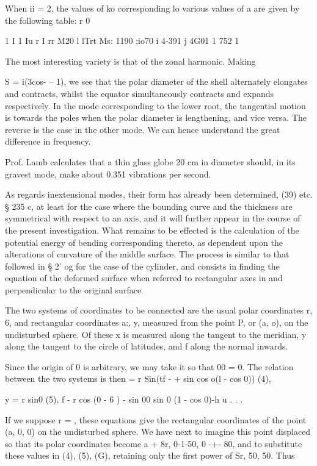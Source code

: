  When ii = 2, the values of ko corresponding lo various values of a are given
by the following table: r 0

1 I 1  Iu r  I rr M20  l lTrt Ms: 1190 ;io70 i 4-391 j 4G01 1 752 1

The most interesting variety is that of the zonal harmonic.  Making

S = i(3cos- -- 1),
we see that the polar diameter of the shell alternately elongates and
contracts, whilst the equator simultaneously contracts and expands
respectively. In the mode corresponding to the lower root, the tangential
motion is towards the poles when the polar diameter is lengthening, and vice
versa.  The reverse is the case in the other mode. We can hence understand the
great difference in frequency.

Prof. Lamb calculates that a thin glass globe 20 cm in diameter should, in its
gravest mode, make about 0.351 vibrations per second.

As regards inextensional modes, their form has already been determined,
(39) etc. § 235 c, at least for the case where the bounding curve and the thickness
are symmetrical with respect to an axis, and it will further appear in the
course of the present investigation. What remains to be effected is the
calculation of the potential energy of bending corresponding thereto, as
dependent upon the alterations of curvature of the middle surface. The process
is similar to that followed in § 2' og for the case of the cylinder, and
consists in finding the equation of the deformed surface when referred to
rectangular axes in and perpendicular to the original surface.

The two systems of coordinates to be connected are the usual polar coordinates
r, 6, and rectangular coordinates a:, y, measured from the point P, or (a, o),
on the undisturbed sphere. Of these x is measured along the tangent to the
meridian, y along the tangent to the circle of latitudes, and f along the
normal inwards.

Since the origin of 0 is arbitrary, we may take it so that 00 = 0. The relation
between the two systems is then = r Sin(tf - + sin cos o(l - cos 0)) (4),

y = r sin0 (5), f - r cos (0 - 6 ) - sin 00 sin 0 (1 - cos 0)-h u . . .

If we suppose r = , these equations give the rectangular coordinates of the
point (a, 0, 0) on the undisturbed sphere.  We have next to imagine this point
displaced so that its polar coordinates become a + 8r, 0-1-50, 0 -+- 80, and to
substitute these values in (4), (5), (G), retaining only the first power of Sr,
50, 50.  Thus

